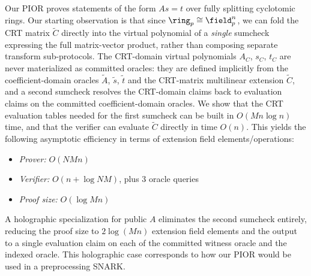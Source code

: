 Our PIOR proves statements of the form $As = t$ over fully splitting cyclotomic rings. Our starting observation is that since $\ring_p \cong \field_p^n$, we can fold the CRT matrix $\tilde{C}$ directly into the virtual polynomial of a \emph{single} sumcheck expressing the full matrix-vector product, rather than composing separate transform sub-protocols. The CRT-domain virtual polynomials $A_C$, $s_C$, $t_C$ are never materialized as committed oracles: they are defined implicitly from the coefficient-domain oracles $\tilde{A}$, $\tilde{s}$, $\tilde{t}$ and the CRT-matrix multilinear extension $\tilde{C}$, and a second sumcheck resolves the CRT-domain claims back to evaluation claims on the committed coefficient-domain oracles. We show that the CRT evaluation tables needed for the first sumcheck can be built in $O(Mn\log n)$ time, and that the verifier can evaluate $\tilde{C}$ directly in time $O(n)$.
This yields the following asymptotic efficiency in terms of extension field elements/operations:
\begin{itemize}[nosep]
    \item \emph{Prover:} $O(NMn)$
    \item \emph{Verifier:} $O(n + \log NM)$, plus $3$ oracle queries
    \item \emph{Proof size:} $O(\log Mn)$
\end{itemize}
A holographic specialization for public $A$ eliminates the second sumcheck entirely, reducing the proof size to $2\log(Mn)$ extension field elements and the output to a single evaluation claim on each of the committed witness oracle and the indexed oracle. This holographic case corresponds to how our PIOR would be used in a preprocessing SNARK.

